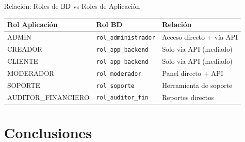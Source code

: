 \documentclass[aspectratio=169]{beamer}
\begin{document}
\begin{frame}{Relación: Roles de BD vs Roles de Aplicación}
    \vspace{0.3cm}
    \centering
    \scriptsize
    \begin{tabular}{lll}
        \toprule
        \textbf{Rol Aplicación} & \textbf{Rol BD} & \textbf{Relación} \\
        \midrule
        ADMIN & \texttt{rol\_administrador} & Acceso directo + vía API \\
        CREADOR & \texttt{rol\_app\_backend} & Solo vía API (mediado) \\
        CLIENTE & \texttt{rol\_app\_backend} & Solo vía API (mediado) \\
        MODERADOR & \texttt{rol\_moderador} & Panel directo + API \\
        SOPORTE & \texttt{rol\_soporte} & Herramienta de soporte \\
        AUDITOR\_FINANCIERO & \texttt{rol\_auditor\_fin} & Reportes directos \\
        \bottomrule
    \end{tabular}
\end{frame}

\section{Conclusiones}
\end{document}
